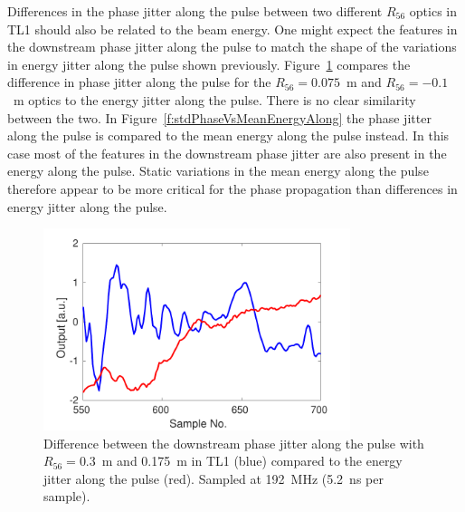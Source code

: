 Differences in the phase jitter along the pulse between two different \(R_{56}\) optics in TL1 should also be related to the beam energy. One might expect the features in the downstream phase jitter along the pulse to match the shape of the variations in energy jitter along the pulse shown previously. Figure~\ref{f:stdPhaseVsStdEnergyAlong} compares the difference in phase jitter along the pulse for the \(R_{56} = 0.075\)~m and \(R_{56} = -0.1\)~m optics to the energy jitter along the pulse. There is no clear similarity between the two. In Figure~\ref{f:stdPhaseVsMeanEnergyAlong} the phase jitter along the pulse is compared to the mean energy along the pulse instead. In this case most of the features in the downstream phase jitter are also present in the energy along the pulse. Static variations in the mean energy along the pulse therefore appear to be more critical for the phase propagation than differences in energy jitter along the pulse. %

\begin{figure}
  \centering
  \includegraphics[width=0.8\textwidth]{Figures/propagation/stdPhaseVsStdEnergyAlong}
  \caption{Difference between the downstream phase jitter along the pulse with \(R_{56} = 0.3\)~m and 0.175~m in TL1 (blue) compared to the energy jitter along the pulse (red). Sampled at 192~MHz (5.2~ns per sample).}
  \label{f:stdPhaseVsStdEnergyAlong}
\end{figure}

